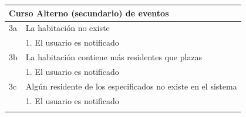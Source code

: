\begin{table}[h!]
{\begin{tabular}{|l|l|l|l|}
        \hline
        \multicolumn{4}{|l|}{{\cellcolor[rgb]{0.886,0.886,0.886}}\textbf{Curso Alterno (secundario) de eventos}}                                                                                                                                                                                              \\ 
        \hline
        3a & \multicolumn{3}{l|}{La habitación no existe}                                                                                                                                                                                                                                                     \\ 
        \hline
        & \multicolumn{3}{l|}{1. El usuario es notificado}                                                                                                                                                                                                                                                 \\ 
        \hline
        3b & \multicolumn{3}{l|}{La habitación contiene más residentes que plazas}                                                                                                                                                                                                                            \\ 
        \hline
        & \multicolumn{3}{l|}{1. El usuario es notificado}                                                                                                                                                                                                                                                 \\ 
        \hline
        3c & \multicolumn{3}{l|}{Algún residente de los especificados no existe en el sistema}                                                                                                                                                                                                                \\ 
        \hline
        & \multicolumn{3}{l|}{1. El usuario es notificado}                                                                                                                                                                                                                                                 \\ 
        \hline
        \multicolumn{4}{l}{}                                                                                                                                                                                                                                                                                  \\ 

\end{tabular}}
\end{table}
